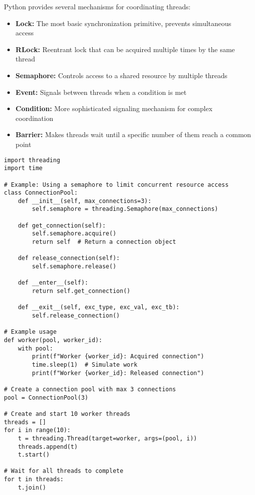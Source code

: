 \documentclass[12pt,letterpaper]{article}
\newenvironment{macterminal}{%
    \begin{mdframed}[
        linecolor=terminalFrame,
        backgroundcolor=terminalBg,
        roundcorner=5pt,
        skipabove=10pt,
        skipbelow=10pt,
        linewidth=1pt,
        innertopmargin=10pt, %
        frametitle={%
            \tikz[baseline=(current bounding box.east), outer sep=0pt]{
                \fill[red!80!black] (0,0) circle (5pt);
                \fill[yellow!80!black] (0.7,0) circle (5pt);
                \fill[green!70!black] (1.4,0) circle (5pt);
            }
        },
        frametitlealignment=\raggedright, %
        frametitleaboveskip=8pt, %
        frametitlebelowskip=0pt, %
    ]
}{%
    \end{mdframed}%
}
\begin{document}
Python provides several mechanisms for coordinating threads:

\begin{itemize}
    \item \textbf{\textcolor{pythonBlue}{Lock:}} The most basic synchronization primitive, prevents simultaneous access
    \item \textbf{\textcolor{pythonBlue}{RLock:}} Reentrant lock that can be acquired multiple times by the same thread
    \item \textbf{\textcolor{pythonBlue}{Semaphore:}} Controls access to a shared resource by multiple threads
    \item \textbf{\textcolor{pythonBlue}{Event:}} Signals between threads when a condition is met
    \item \textbf{\textcolor{pythonBlue}{Condition:}} More sophisticated signaling mechanism for complex coordination
    \item \textbf{\textcolor{pythonBlue}{Barrier:}} Makes threads wait until a specific number of them reach a common point
\end{itemize}

\begin{macterminal}
\begin{lstlisting}
import threading
import time

# Example: Using a semaphore to limit concurrent resource access
class ConnectionPool:
    def __init__(self, max_connections=3):
        self.semaphore = threading.Semaphore(max_connections)
        
    def get_connection(self):
        self.semaphore.acquire()
        return self  # Return a connection object
        
    def release_connection(self):
        self.semaphore.release()
        
    def __enter__(self):
        return self.get_connection()
        
    def __exit__(self, exc_type, exc_val, exc_tb):
        self.release_connection()

# Example usage
def worker(pool, worker_id):
    with pool:
        print(f"Worker {worker_id}: Acquired connection")
        time.sleep(1)  # Simulate work
        print(f"Worker {worker_id}: Released connection")

# Create a connection pool with max 3 connections
pool = ConnectionPool(3)

# Create and start 10 worker threads
threads = []
for i in range(10):
    t = threading.Thread(target=worker, args=(pool, i))
    threads.append(t)
    t.start()

# Wait for all threads to complete
for t in threads:
    t.join()
\end{lstlisting}
\end{macterminal}
\end{document}
